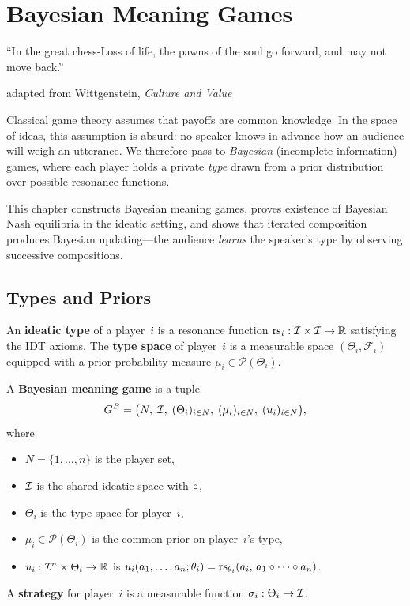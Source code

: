 
\chapter{Bayesian Meaning Games}
\label{ch:bayesian}

\epigraph{``In the great chess-Loss of life, the pawns of the soul
go forward, and may not move back.''}{adapted from Wittgenstein,
\textit{Culture and Value}}

Classical game theory assumes that payoffs are common knowledge.
In the space of ideas, this assumption is absurd: no speaker knows
in advance how an audience will weigh an utterance.  We therefore
pass to \emph{Bayesian} (incomplete-information) games, where
each player holds a private \emph{type} drawn from a prior
distribution over possible resonance functions.

This chapter constructs Bayesian meaning games, proves existence
of Bayesian Nash equilibria in the ideatic setting, and shows that
iterated composition produces Bayesian updating---the audience
\emph{learns} the speaker's type by observing successive compositions.

\section{Types and Priors}
\label{sec:types}

\begin{definition}
\label{def:ideatic-type}
An \textbf{ideatic type} of a player~$i$ is a resonance function
$\mathrm{rs}_i : \mathcal{I} \times \mathcal{I} \to \mathbb{R}$ satisfying the IDT axioms.
The \textbf{type space} of player~$i$ is a measurable space
$(\Theta_i, \mathcal{F}_i)$ equipped with a prior probability
measure $\mu_i \in \mathcal{P}(\Theta_i)$.
\end{definition}

\begin{definition}
\label{def:bayesian-game}
A \textbf{Bayesian meaning game} is a tuple
\[
  G^B = \bigl(N,\; \mathcal{I},\; (\Theta_i)_{i\in N},\;
  (\mu_i)_{i\in N},\; (u_i)_{i\in N}\bigr),
\]
where
\begin{itemize}
  \item $N = \{1,\ldots,n\}$ is the player set,
  \item $\mathcal{I}$ is the shared ideatic space with $\circ$,
  \item $\Theta_i$ is the type space for player~$i$,
  \item $\mu_i \in \mathcal{P}(\Theta_i)$ is the common prior
        on player~$i$'s type,
  \item $u_i : \mathcal{I}^n \times \Theta_i \to \mathbb{R}$ is
        $u_i(a_1,\ldots,a_n;\theta_i)
        = \mathrm{rs}_{\theta_i}(a_i,\, a_1\circ\cdots\circ a_n)$.
\end{itemize}
A \textbf{strategy} for player~$i$ is a measurable function
$\sigma_i : \Theta_i \to \mathcal{I}$.
\end{definition}

